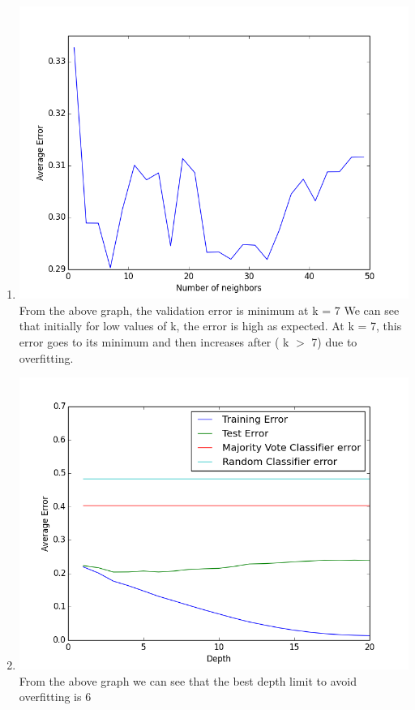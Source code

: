 \documentclass[11pt]{article}
\newcommand{\solution}[1]{{{\color{blue}{\bf Solution:} {#1}}}}
\begin{document}
\begin{enumerate}
\begin{center}
\begin{tabular}{| c | c | c |}
\end{tabular}
\end{center}
\newpage
\item
\solution{} \newline
\includegraphics[scale=0.6]{4f.png}
From the above graph, the validation error is minimum at k = 7\newline
We can see that initially for low values of k, the error is high as expected. 
At k = 7, this error goes to its minimum and then increases after ( k $>$ 7) due to overfitting.
\newpage
\item
\solution{} \newline
\includegraphics[scale=0.6]{4g.png}
From the above graph we can see that the best depth limit to avoid overfitting is 6

\end{enumerate}
\end{document}
